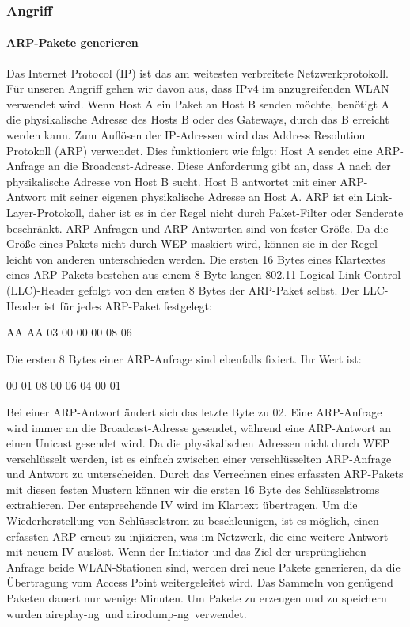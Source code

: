 \documentclass[10pt,a4paper]{article}
\begin{document}
\subsubsection{Angriff}
\paragraph{ARP-Pakete generieren}
Das Internet Protocol (IP) ist das am weitesten verbreitete Netzwerkprotokoll. Für unseren Angriff gehen wir davon aus, dass IPv4 im anzugreifenden WLAN verwendet wird. Wenn Host A ein Paket an Host B senden möchte, benötigt A die physikalische Adresse des Hosts B oder des Gateways, durch das B erreicht werden kann. Zum Auflösen der IP-Adressen wird das Address Resolution Protokoll (ARP) verwendet. Dies funktioniert wie folgt: Host A sendet eine ARP-Anfrage an die Broadcast-Adresse. Diese Anforderung gibt an, dass A nach der physikalische Adresse von Host B sucht. Host B antwortet mit einer ARP-Antwort mit seiner eigenen physikalische Adresse an Host A. ARP ist ein Link-Layer-Protokoll, daher ist es in der Regel nicht durch Paket-Filter oder Senderate beschränkt. ARP-Anfragen und ARP-Antworten sind von fester Größe. Da die Größe eines Pakets nicht durch WEP maskiert wird, können sie in der Regel leicht von anderen unterschieden werden. Die ersten 16 Bytes eines Klartextes eines ARP-Pakets bestehen aus einem 8 Byte langen 802.11 Logical Link Control (LLC)-Header gefolgt von den ersten 8 Bytes der ARP-Paket selbst. Der LLC-Header ist für jedes ARP-Paket festgelegt:\\
\begin{center}
	AA AA 03 00 00 00 08 06\\
\end{center}
Die ersten 8 Bytes einer ARP-Anfrage sind ebenfalls fixiert. Ihr Wert ist:\\
\begin{center}
	00 01 08 00 06 04 00 01\\
\end{center}
Bei einer ARP-Antwort ändert sich das letzte Byte zu 02. Eine ARP-Anfrage wird immer an die Broadcast-Adresse gesendet, während eine ARP-Antwort an einen Unicast gesendet wird. Da die physikalischen Adressen nicht durch WEP verschlüsselt werden, ist es einfach zwischen einer verschlüsselten ARP-Anfrage und Antwort zu unterscheiden. Durch das Verrechnen eines erfassten ARP-Pakets mit diesen festen Mustern können wir die ersten 16 Byte des Schlüsselstroms extrahieren. Der entsprechende IV wird im Klartext übertragen. Um die Wiederherstellung von Schlüsselstrom zu beschleunigen, ist es möglich, einen erfassten ARP erneut zu injizieren, was im Netzwerk, die eine weitere Antwort mit neuem IV auslöst. Wenn der Initiator und das Ziel der ursprünglichen Anfrage beide WLAN-Stationen sind, werden drei neue Pakete generieren, da die Übertragung vom Access Point weitergeleitet wird. Das Sammeln von genügend Paketen dauert nur wenige Minuten. Um Pakete zu erzeugen und zu speichern wurden \glqq aireplay-ng\grqq\ und \glqq airodump-ng\grqq\ verwendet.
\end{document}
